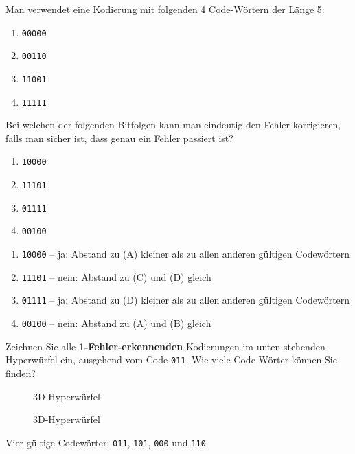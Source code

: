 \begin{myexercise}
Man verwendet eine Kodierung mit folgenden 4 Code-Wörtern der Länge 5:
\begin{enumerate}[label=(\Alph*)]
\item \texttt{00000}
\item \texttt{00110}
\item \texttt{11001}
\item \texttt{11111}
\end{enumerate}
 
Bei welchen der folgenden Bitfolgen kann man eindeutig den Fehler korrigieren, falls man sicher ist, dass genau ein Fehler passiert ist?
\begin{enumerate}
\item \texttt{10000}
\item \texttt{11101}
\item \texttt{01111}
\item \texttt{00100}
\end{enumerate}

\begin{myanswer}
\begin{enumerate}
\item \texttt{10000} -- ja: Abstand zu (A) kleiner als zu allen anderen gültigen Codewörtern
\item \texttt{11101} -- nein: Abstand zu (C) und (D) gleich
\item \texttt{01111} -- ja: Abstand zu (D) kleiner als zu allen anderen gültigen Codewörtern
\item \texttt{00100} -- nein: Abstand zu (A) und (B) gleich
\end{enumerate}

\end{myanswer}
\end{myexercise}



\begin{myexercise}
Zeichnen Sie alle \textbf{1-Fehler-erkennenden} Kodierungen im unten stehenden Hyperwürfel ein, ausgehend vom Code \texttt{011}. Wie viele Code-Wörter können Sie finden?
\begin{figure}[H]
\centering
{}
\caption{3D-Hyperwürfel}
\end{figure}

\begin{myanswer}

\begin{figure}[H]
\centering
{}
\caption{3D-Hyperwürfel}
\end{figure}
Vier gültige Codewörter: \texttt{011}, \texttt{101}, \texttt{000} und \texttt{110}
\end{myanswer}

\end{myexercise}

